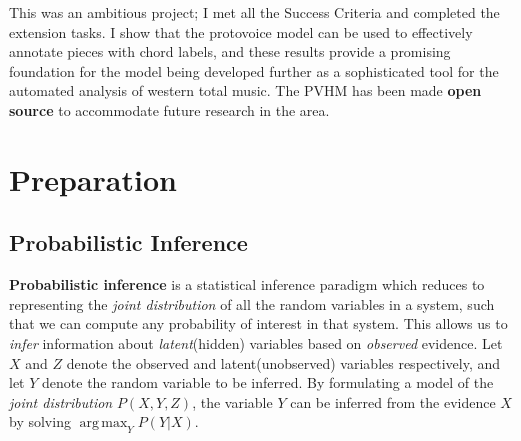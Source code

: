 \documentclass[12pt,a4paper,twoside,openright]{report}
\DeclareMathOperator*{\argmax}{arg\,max}
\theoremstyle{definition}
\begin{document}
This was an ambitious project; I met all the Success Criteria and completed the extension tasks. I show that the protovoice model can be used to effectively annotate pieces with chord labels, and these results provide a promising foundation for the model being developed further as a sophisticated tool for the automated analysis of western total music. The PVHM has been made \textbf{open source} to accommodate future research in the area.




\chapter{Preparation}%

\section{Probabilistic Inference}


\textbf{Probabilistic inference} is a statistical inference paradigm which reduces to representing the \textit{joint distribution} of all the random variables in a system, such that we can compute any probability of interest in that system. This allows us to \textit{infer} information about \textit{latent}(hidden) variables based on \textit{observed} evidence.
Let $X$ and $Z$ denote the observed and latent(unobserved) variables respectively, and let $Y$ denote the random variable to be inferred. 
By formulating a model of the \textit{joint distribution} $P(X,Y,Z)$, the variable $Y$ can be inferred from the evidence $X$ by solving $\argmax_Y P(Y|X)$. 
\end{document}
